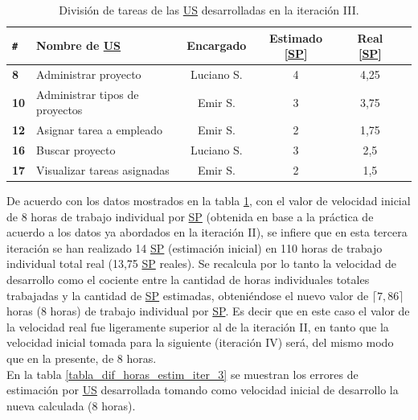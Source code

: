 \documentclass[a4paper, 12pt,twoside]{report}  %
\numberwithin{equation}{subsection} %
\begin{document}
\begin{table}[h!]
	\centering
	\begin{tabular}{ |p{0.5cm}|p{6cm}|c|c|c|c| }
		\hline
		\verb|#|& \textbf{Nombre de \hyperlink{US}{US}}& \textbf{Encargado} & \textbf{Estimado [\hyperlink{SP}{SP}]} & \textbf{Real [\hyperlink{SP}{SP}]} \\
		\hline
		\textbf{8} & Administrar proyecto & \cellcolor{marca_US_luciano}Luciano S. & 4 & 4,25 \\
		\hline
		\textbf{10} & Administrar tipos de proyectos & \cellcolor{marca_US_emir}Emir S. & 3 & 3,75 \\
		\hline
		\textbf{12} & Asignar tarea a empleado & \cellcolor{marca_US_emir}Emir S. & 2 & 1,75 \\
		\hline
		\textbf{16} & Buscar proyecto & \cellcolor{marca_US_luciano}Luciano S. & 3 & 2,5 \\
		\hline
		\textbf{17} & Visualizar tareas asignadas & \cellcolor{marca_US_emir}Emir S. & 2 & 1,5 \\
		\hline
	\end{tabular}
	\caption{División de tareas de las \protect\hyperlink{US}{US} desarrolladas en la iteración III.}
	\label{tabla_desarrollo_iter_3}
\end{table}

De acuerdo con los datos mostrados en la tabla \ref{tabla_desarrollo_iter_3}, con el valor de velocidad inicial de 8 horas de trabajo individual por \hyperlink{SP}{SP} (obtenida en base a la práctica de acuerdo a los datos ya abordados en la iteración II), se infiere que en esta tercera iteración se han realizado 14 \hyperlink{SP}{SP} (estimación inicial) en 110 horas de trabajo individual total real (13,75 \hyperlink{SP}{SP} reales). Se recalcula por lo tanto la velocidad de desarrollo como el cociente entre la cantidad de horas individuales totales trabajadas y la cantidad de \hyperlink{SP}{SP} estimadas, obteniéndose el nuevo valor de \begin{math}\lceil 7,86\rceil\end{math} horas (8 horas) de trabajo individual por \hyperlink{SP}{SP}. Es decir que en este caso el valor de la velocidad real fue ligeramente superior al de la iteración II, en tanto que la velocidad inicial tomada para la siguiente (iteración IV) será, del mismo modo que en la presente, de 8 horas.\\
\indent En la tabla \ref{tabla_dif_horas_estim_iter_3} se muestran los errores de estimación por \hyperlink{US}{US} desarrollada tomando como velocidad inicial de desarrollo la nueva calculada (8 horas).
\end{document}
